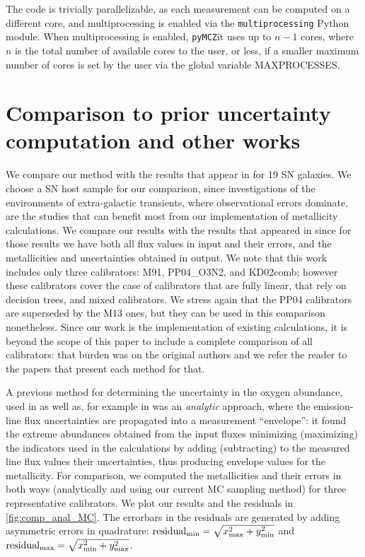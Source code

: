 \documentclass{emulateapj}
\begin{document}
The code is trivially parallelizable, as each measurement can be
computed on a different core, and multiprocessing is enabled via the
\verb=multiprocessing= Python module. When multiprocessing is enabled,
\verb=pyMCZ=it uses up to $n-1$ cores, where $n$ is the total number
of available cores to the user, or less, if a smaller maximum number
of cores is set by the user via the global variable MAXPROCESSES.







\section{Comparison to prior uncertainty computation and other works }\label{sec:comp_sec}

We compare our method with the results that appear in
\citealt{modjaz11} for 19 SN galaxies. We choose a SN host sample for
our comparison, since investigations of the environments of
extra-galactic transients, where observational errors dominate, are
the studies that can benefit most from our implementation of
metallicity calculations. We compare our results with the results that
appeared in \citealt{modjaz11} since for those results we have both
all flux values in input and their errors, and the metallicities and
uncertainties obtained in output. We note that this work includes only
three calibrators: M91, PP04\_O3N2, and KD02comb; however these
calibrators cover the case of calibrators that are fully linear, that
rely on decision trees, and mixed calibrators. We stress again that
the PP04 calibrators are superseded by the M13 ones, but they can be
used in this comparison nonetheless. Since our work is the
implementation of existing calculations, it is beyond the scope of
this paper to include a complete comparison of all calibrators: that
burden was on the original authors and we refer the reader to the
papers that present each method for that.

A previous method for determining the uncertainty in the oxygen
abundance, used in \citealt{modjaz11} as well as, for example in
\citealt{modjaz08_Z,kewley10,rupke10} was an \emph{analytic} approach,
where the emission-line flux uncertainties are propagated into a
measurement ``envelope'': it found the extreme abundances obtained
from the input fluxes minimizing (maximizing) the indicators used in
the calculations by adding (subtracting) to the measured line flux
values their uncertainties, thus producing envelope values for the
metallicity. For comparison, we computed the metallicities and their
errors in both ways (analytically and using our current MC sampling
method) for three representative calibrators. We plot our results and
the residuals in \autoref{fig:comp_anal_MC}.  The errorbars in the
residuals are generated by adding asymmetric errors in quadrature:
$\mathrm{residual}_{\rm min}=\sqrt {x_{\rm max}^2 + y_{\rm min}^2}$
and $\mathrm{residual}_{\rm max}=\sqrt{x_{\rm min}^2 + y_{\rm
    max}^2}$.
\end{document}
